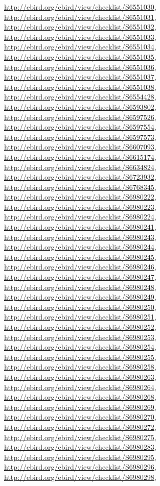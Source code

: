 \documentclass[9pt, article]{memoir}
\begin{document}
\begin{multicols}{2}
\url{http://ebird.org/ebird/view/checklist/S6551030}, 
\url{http://ebird.org/ebird/view/checklist/S6551031}, 
\url{http://ebird.org/ebird/view/checklist/S6551032}, 
\url{http://ebird.org/ebird/view/checklist/S6551033}, 
\url{http://ebird.org/ebird/view/checklist/S6551034}, 
\url{http://ebird.org/ebird/view/checklist/S6551035}, 
\url{http://ebird.org/ebird/view/checklist/S6551036}, 
\url{http://ebird.org/ebird/view/checklist/S6551037}, 
\url{http://ebird.org/ebird/view/checklist/S6551038}, 
\url{http://ebird.org/ebird/view/checklist/S6554428}, 
\url{http://ebird.org/ebird/view/checklist/S6593802}, 
\url{http://ebird.org/ebird/view/checklist/S6597526}, 
\url{http://ebird.org/ebird/view/checklist/S6597554}, 
\url{http://ebird.org/ebird/view/checklist/S6597573}, 
\url{http://ebird.org/ebird/view/checklist/S6607093}, 
\url{http://ebird.org/ebird/view/checklist/S6615174}, 
\url{http://ebird.org/ebird/view/checklist/S6634824}, 
\url{http://ebird.org/ebird/view/checklist/S6723932}, 
\url{http://ebird.org/ebird/view/checklist/S6768345}, 
\url{http://ebird.org/ebird/view/checklist/S6980222}, 
\url{http://ebird.org/ebird/view/checklist/S6980223}, 
\url{http://ebird.org/ebird/view/checklist/S6980224}, 
\url{http://ebird.org/ebird/view/checklist/S6980241}, 
\url{http://ebird.org/ebird/view/checklist/S6980243}, 
\url{http://ebird.org/ebird/view/checklist/S6980244}, 
\url{http://ebird.org/ebird/view/checklist/S6980245}, 
\url{http://ebird.org/ebird/view/checklist/S6980246}, 
\url{http://ebird.org/ebird/view/checklist/S6980247}, 
\url{http://ebird.org/ebird/view/checklist/S6980248}, 
\url{http://ebird.org/ebird/view/checklist/S6980249}, 
\url{http://ebird.org/ebird/view/checklist/S6980250}, 
\url{http://ebird.org/ebird/view/checklist/S6980251}, 
\url{http://ebird.org/ebird/view/checklist/S6980252}, 
\url{http://ebird.org/ebird/view/checklist/S6980253}, 
\url{http://ebird.org/ebird/view/checklist/S6980254}, 
\url{http://ebird.org/ebird/view/checklist/S6980255}, 
\url{http://ebird.org/ebird/view/checklist/S6980258}, 
\url{http://ebird.org/ebird/view/checklist/S6980263}, 
\url{http://ebird.org/ebird/view/checklist/S6980264}, 
\url{http://ebird.org/ebird/view/checklist/S6980268}, 
\url{http://ebird.org/ebird/view/checklist/S6980269}, 
\url{http://ebird.org/ebird/view/checklist/S6980270}, 
\url{http://ebird.org/ebird/view/checklist/S6980272}, 
\url{http://ebird.org/ebird/view/checklist/S6980275}, 
\url{http://ebird.org/ebird/view/checklist/S6980283}, 
\url{http://ebird.org/ebird/view/checklist/S6980295}, 
\url{http://ebird.org/ebird/view/checklist/S6980296}, 
\url{http://ebird.org/ebird/view/checklist/S6980298}, 

\end{multicols}
\end{document}
